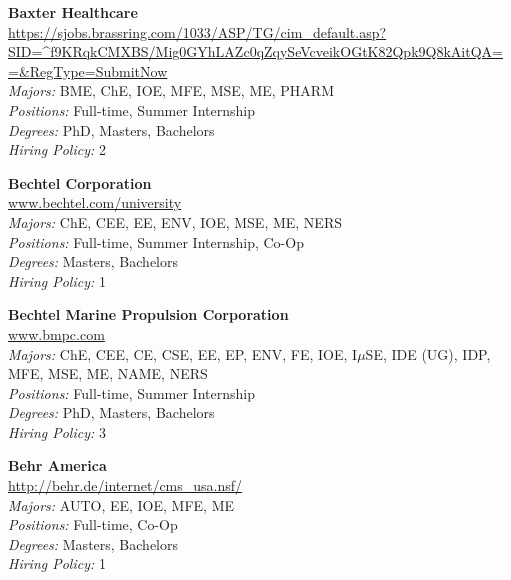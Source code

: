 \documentclass{article}
\begin{document}
\begin{center}
\begin{multicols}{3}
\begin{minipage}{.9\columnwidth}{\Large\bf Baxter Healthcare }\\
	\url{https://sjobs.brassring.com/1033/ASP/TG/cim_default.asp?SID=^f9KRqkCMXBS/Mig0GYhLAZc0qZqySeVcveikOGtK82Qpk9Q8kAitQA==&RegType=SubmitNow}\\
	\emph{Majors:} BME, ChE, IOE, MFE, MSE, ME, PHARM\\
	\emph{Positions:} Full-time, Summer Internship\\
	\emph{Degrees:} PhD, Masters, Bachelors\\
	\emph{Hiring Policy:} 2\\
\end{minipage}
 
\begin{minipage}{.9\columnwidth}{\Large\bf Bechtel Corporation }\\
	\url{www.bechtel.com/university}\\
	\emph{Majors:} ChE, CEE, EE, ENV, IOE, MSE, ME, NERS\\
	\emph{Positions:} Full-time, Summer Internship, Co-Op\\
	\emph{Degrees:} Masters, Bachelors\\
	\emph{Hiring Policy:} 1\\
\end{minipage}
 
\begin{minipage}{.9\columnwidth}{\Large\bf Bechtel Marine Propulsion Corporation }\\
	\url{www.bmpc.com}\\
	\emph{Majors:} ChE, CEE, CE, CSE, EE, EP, ENV, FE, IOE, I$\mu$SE, IDE (UG), IDP, MFE, MSE, ME, NAME, NERS\\
	\emph{Positions:} Full-time, Summer Internship\\
	\emph{Degrees:} PhD, Masters, Bachelors\\
	\emph{Hiring Policy:} 3\\
\end{minipage}
 
\begin{minipage}{.9\columnwidth}{\Large\bf Behr America }\\
	\url{http://behr.de/internet/cms_usa.nsf/}\\
	\emph{Majors:} AUTO, EE, IOE, MFE, ME\\
	\emph{Positions:} Full-time, Co-Op\\
	\emph{Degrees:} Masters, Bachelors\\
	\emph{Hiring Policy:} 1\\
\end{minipage}
 

\end{multicols}
\end{center}
\end{document}
